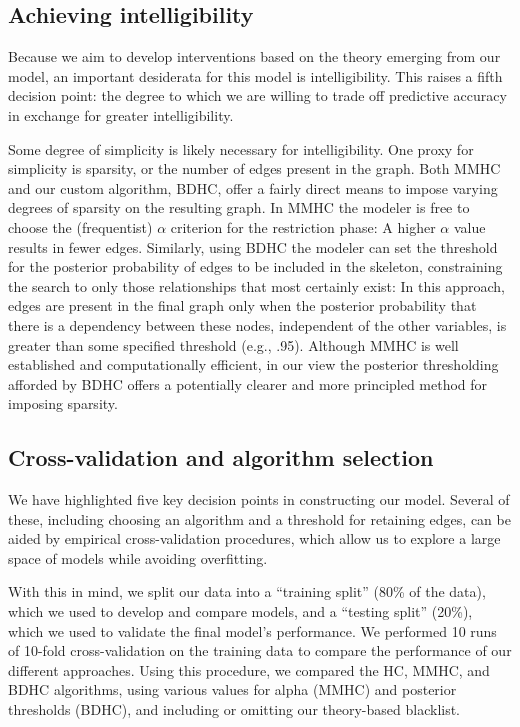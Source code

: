 \documentclass[10pt, letterpaper]{article}
\begin{document}
\subsection{Achieving intelligibility}\label{achieving-intelligibility}

Because we aim to develop interventions based on the theory emerging
from our model, an important desiderata for this model is
intelligibility. This raises a fifth decision point: the degree to which
we are willing to trade off predictive accuracy in exchange for greater
intelligibility.

Some degree of simplicity is likely necessary for intelligibility. One
proxy for simplicity is sparsity, or the number of edges present in the
graph. Both MMHC and our custom algorithm, BDHC, offer a fairly direct
means to impose varying degrees of sparsity on the resulting graph. In
MMHC the modeler is free to choose the (frequentist) \(\alpha\)
criterion for the restriction phase: A higher \(\alpha\) value results
in fewer edges. Similarly, using BDHC the modeler can set the threshold
for the posterior probability of edges to be included in the skeleton,
constraining the search to only those relationships that most certainly
exist: In this approach, edges are present in the final graph only when
the posterior probability that there is a dependency between these
nodes, independent of the other variables, is greater than some
specified threshold (e.g., .95). Although MMHC is well established and
computationally efficient, in our view the posterior thresholding
afforded by BDHC offers a potentially clearer and more principled method
for imposing sparsity.

\subsection{Cross-validation and algorithm
selection}\label{cross-validation-and-algorithm-selection}

We have highlighted five key decision points in constructing our model.
Several of these, including choosing an algorithm and a threshold for
retaining edges, can be aided by empirical cross-validation procedures,
which allow us to explore a large space of models while avoiding
overfitting.

With this in mind, we split our data into a ``training split'' (80\% of
the data), which we used to develop and compare models, and a ``testing
split'' (20\%), which we used to validate the final model's performance.
We performed 10 runs of 10-fold cross-validation on the training data to
compare the performance of our different approaches. Using this
procedure, we compared the HC, MMHC, and BDHC algorithms, using various
values for alpha (MMHC) and posterior thresholds (BDHC), and including
or omitting our theory-based blacklist.
\end{document}
